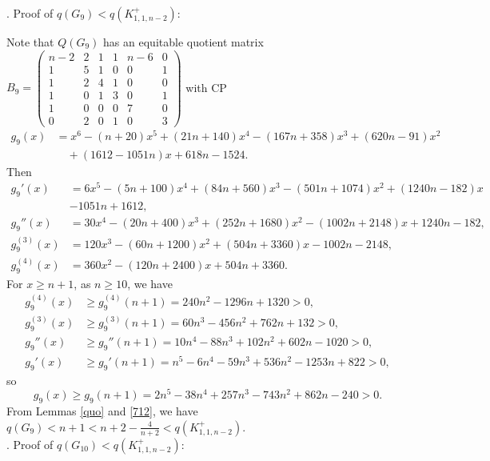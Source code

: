 \documentclass[12pt]{article}
\begin{document}
\begin{appendices}
. Proof of $q(G_{9})<q(K_{1,1,n-2}^+)$:

Note that  $Q(G_{9})$ has an equitable quotient matrix
$B_{9}=
\left(\begin{smallmatrix}
n-2 & 2 & 1 & 1 & n-6 & 0\\
1 &5 &1 &0 &0 &1\\
1 &2 &4 &1 &0 &0\\
1 &0 &1 &3 &0 &1\\
1 &0 &0 &0 &7 &0\\
0 &2 &0 &1 &0 &3
\end{smallmatrix}\right)$
with CP
\begin{align*}
g_{9}(x)&=x^6-( n + 20)x^5 + (21n + 140)x^4 - ( 167n + 358)x^3 + (620n -91)x^2\\
&\quad + (1612 - 1051n)x + 618n - 1524.
\end{align*}
Then
\begin{align*}
g_{9}'(x)&=6x^5 - (5n + 100)x^4 + (84n + 560)x^3 - ( 501n +1074)x^2+ (1240n - 182)x\\
& - 1051n + 1612,\\
g_{9}''(x)&=30x^4 - ( 20n + 400)x^3 + (252n + 1680)x^2 - ( 1002n + 2148)x + 1240n - 182,\\
g_{9}^{(3)}(x)&=120x^3 - ( 60n + 1200)x^2 + (504n + 3360)x - 1002n - 2148,\\
g_{9}^{(4)}(x)&=360x^2 - ( 120n + 2400)x + 504n + 3360.
\end{align*}
For  $x\ge n+1$, as $n\ge 10$, we have
\begin{align*}
g_{9}^{(4)}(x)&\ge g_{9}^{(4)}(n+1)=240n^2 - 1296n + 1320>0,\\
g_{9}^{(3)}(x)&\ge g_{9}^{(3)}(n+1)=60n^3 - 456n^2 + 762n + 132>0,\\
g_{9}''(x)&\ge g_{9}''(n+1)=10n^4 - 88n^3 + 102n^2 + 602n - 1020>0,\\
g_{9}'(x)&\ge g_{9}'(n+1)=n^5 - 6n^4 - 59n^3 + 536n^2 - 1253n + 822>0,
\end{align*}
so
\[
g_{9}(x)\ge g_{9}(n+1)=2n^5 - 38n^4 + 257n^3 - 743n^2 + 862n - 240>0.
\]
From Lemmas \ref{quo} and \ref{712}, we have $q(G_{9})<n+1<n+2-\frac{4}{n+2}<q(K_{1,1,n-2}^+)$.\\

. Proof of $q(G_{10})<q(K_{1,1,n-2}^+)$:


\end{appendices}
\end{document}
